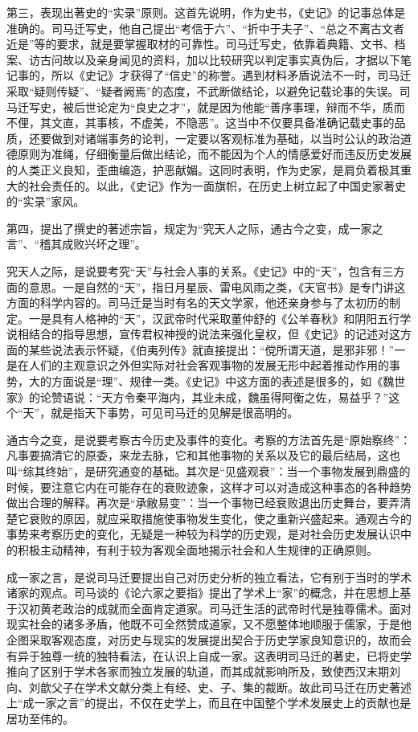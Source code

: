 \documentclass[12pt,UTF8]{ctexbook}
\begin{document}
第三，表现出著史的“实录”原则。这首先说明，作为史书，《史记》的记事总体是准确的。司马迁写史，他自己提出“考信于六”、“折中于夫子”、“总之不离古文者近是”等的要求，就是要掌握取材的可靠性。司马迁写史，依靠着典籍、文书、档案、访古问故以及亲身闻见的资料，加以比较研究以判定事实真伪后，才据以下笔记事的，所以《史记》才获得了“信史”的称誉。遇到材料矛盾说法不一时，司马迁采取“疑则传疑”、“疑者阙焉”的态度，不武断做结论，以避免记载论事的失误。司马迁写史，被后世论定为“良史之才”，就是因为他能“善序事理，辩而不华，质而不俚，其文直，其事核，不虚美，不隐恶”。这当中不仅要具备准确记载史事的品质，还要做到对诸端事务的论判，一定要以客观标准为基础，以当时公认的政治道德原则为准绳，仔细衡量后做出结论，而不能因为个人的情感爱好而违反历史发展的人类正义良知，歪曲编造，护恶献媚。这同时表明，作为史家，是肩负着极其重大的社会责任的。以此，《史记》作为一面旗帜，在历史上树立起了中国史家著史的“实录”家风。

第四，提出了撰史的著述宗旨，规定为“究天人之际，通古今之变，成一家之言”、“稽其成败兴坏之理”。

究天人之际，是说要考究“天”与社会人事的关系。《史记》中的“天”，包含有三方面的意思。一是自然的“天”，指日月星辰、雷电风雨之类，《天官书》是专门讲这方面的科学内容的。司马迁是当时有名的天文学家，他还亲身参与了太初历的制定。一是具有人格神的“天”，汉武帝时代采取董仲舒的《公羊春秋》和阴阳五行学说相结合的指导思想，宣传君权神授的说法来强化皇权，但《史记》的记述对这方面的某些说法表示怀疑，《伯夷列传》就直接提出：“傥所谓天道，是邪非邪！”一是在人们的主观意识之外但实际对社会客观事物的发展无形中起着推动作用的事势，大的方面说是“理”、规律一类。《史记》中这方面的表述是很多的，如《魏世家》的论赞语说：“天方令秦平海内，其业未成，魏虽得阿衡之佐，易益乎？”这个“天”，就是指天下事势，可见司马迁的见解是很高明的。

通古今之变，是说要考察古今历史及事件的变化。考察的方法首先是“原始察终”：凡事要搞清它的原委，来龙去脉，它和其他事物的关系以及它的最后结局，这也叫“综其终始”，是研究通变的基础。其次是“见盛观衰”：当一个事物发展到鼎盛的时候，要注意它内在可能存在的衰败迹象，这样才可以对造成这种事态的各种趋势做出合理的解释。再次是“承敝易变”：当一个事物已经衰败退出历史舞台，要弄清楚它衰败的原因，就应采取措施使事物发生变化，使之重新兴盛起来。通观古今的事势来考察历史的变化，无疑是一种较为科学的历史观，是对社会历史发展认识中的积极主动精神，有利于较为客观全面地揭示社会和人生规律的正确原则。

成一家之言，是说司马迁要提出自己对历史分析的独立看法，它有别于当时的学术诸家的观点。司马谈的《论六家之要指》提出了学术上“家”的概念，并在思想上基于汉初黄老政治的成就而全面肯定道家。司马迁生活的武帝时代是独尊儒术。面对现实社会的诸多矛盾，他既不可全然赞成道家，又不愿整体地顺服于儒家，于是他企图采取客观态度，对历史与现实的发展提出契合于历史学家良知意识的，故而会有异于独尊一统的独特看法，在认识上自成一家。这表明司马迁的著史，已将史学推向了区别于学术各家而独立发展的轨道，而其成就影响所及，致使西汉末期刘向、刘歆父子在学术文献分类上有经、史、子、集的裁断。故此司马迁在历史著述上“成一家之言”的提出，不仅在史学上，而且在中国整个学术发展史上的贡献也是居功至伟的。
\end{document}
